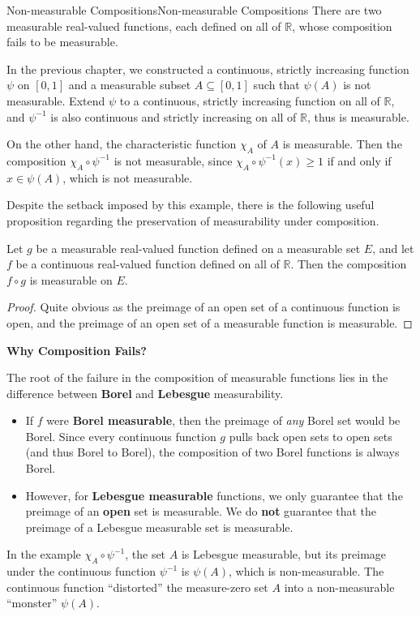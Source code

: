 \documentclass[../main.tex]{subfiles}
\begin{document}
\begin{example}{Non-measurable Compositions}{Non-measurable Compositions}
	There are two measurable real-valued functions, each defined on all of $\mathbb{R}$, whose composition fails to be measurable.

	In the previous chapter, we constructed a continuous, strictly increasing function $\psi$ on $[0,1]$ and a measurable subset $A \subseteq [0,1]$ such that $\psi(A)$ is not measurable. Extend $\psi$ to a continuous, strictly increasing function on all of $\mathbb{R}$, and $\psi^{-1}$ is also continuous and strictly increasing on all of $\mathbb{R}$, thus is measurable.

	On the other hand, the characteristic function $\chi_A$ of $A$ is measurable. Then the composition $\chi_A \circ \psi^{-1}$ is not measurable, since $\chi_A \circ \psi^{-1}(x) \geq 1$ if and only if $x \in \psi(A)$, which is not measurable.
\end{example}

Despite the setback imposed by this example, there is the following useful proposition regarding the preservation of measurability under composition.

\begin{proposition}{}{}
	Let $g$ be a measurable real-valued function defined on a measurable set $E$, and let $f$ be a continuous real-valued function defined on all of $\mathbb{R}$. Then the composition $f \circ g$ is measurable on $E$.
\end{proposition}
\begin{proof}
	Quite obvious as the preimage of an open set of a continuous function is open, and the preimage of an open set of a measurable function is measurable.
\end{proof}

\begin{remark}
	\textbf{Why Composition Fails?}

	The root of the failure in the composition of measurable functions lies in the difference between \textbf{Borel} and \textbf{Lebesgue} measurability.
	\begin{itemize}
		\item If $f$ were \textbf{Borel measurable}, then the preimage of \textit{any} Borel set would be Borel. Since every continuous function $g$ pulls back open sets to open sets (and thus Borel to Borel), the composition of two Borel functions is always Borel.
		\item However, for \textbf{Lebesgue measurable} functions, we only guarantee that the preimage of an \textbf{open} set is measurable. We do \textbf{not} guarantee that the preimage of a Lebesgue measurable set is measurable.
	\end{itemize}
	In the example $\chi_A \circ \psi^{-1}$, the set $A$ is Lebesgue measurable, but its preimage under the continuous function $\psi^{-1}$ is $\psi(A)$, which is non-measurable. The continuous function ``distorted'' the measure-zero set $A$ into a non-measurable ``monster'' $\psi(A)$.
\end{remark}
\end{document}
